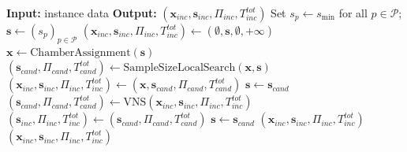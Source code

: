 \documentclass[11pt]{article}
\begin{document}
\begin{algorithm}[H]
\caption{Overall Solution Framework}
\label{alg:framework}
\label{alg:overall_framework}
\begin{algorithmic}[1]
\State \textbf{Input:} instance data
\State \textbf{Output:} \((\mathbf{x}_{inc},\mathbf{s}_{inc},\Pi_{inc},T^{tot}_{inc})\)
\State Set \(s_p\leftarrow s_{\min}\) for all \(p\in\mathcal{P}\); \(\mathbf{s}\leftarrow(s_p)_{p\in\mathcal{P}}\) \label{step:fw-init}
\State \((\mathbf{x}_{inc},\mathbf{s}_{inc},\Pi_{inc},T^{tot}_{inc})\leftarrow(\emptyset,\mathbf{s},\emptyset,+\infty)\)
    \State \(\mathbf{x}\leftarrow\text{ChamberAssignment}(\mathbf{s})\) \label{step:fw-assign}
    \State \((\mathbf{s}_{cand},\Pi_{cand},T^{tot}_{cand})\leftarrow\text{SampleSizeLocalSearch}(\mathbf{x},\mathbf{s})\) \label{step:fw-ls}
     \label{step:fw-lex}
        \State \((\mathbf{x}_{inc},\mathbf{s}_{inc},\Pi_{inc},T^{tot}_{inc})\leftarrow(\mathbf{x},\mathbf{s}_{cand},\Pi_{cand},T^{tot}_{cand})\)
        \State \(\mathbf{s}\leftarrow\mathbf{s}_{cand}\)
    \Else
        \State \((\mathbf{s}_{cand},\Pi_{cand},T^{tot}_{cand})\leftarrow\text{VNS}(\mathbf{x}_{inc},\mathbf{s}_{inc},\Pi_{inc},T^{tot}_{inc})\) \label{step:fw-vns}
            \State \((\mathbf{s}_{inc},\Pi_{inc},T^{tot}_{inc})\leftarrow(\mathbf{s}_{cand},\Pi_{cand},T^{tot}_{cand})\)
            \State \(\mathbf{s}\leftarrow\mathbf{s}_{cand}\)
        \Else
            \State \Return \((\mathbf{x}_{inc},\mathbf{s}_{inc},\Pi_{inc},T^{tot}_{inc})\) \label{step:fw-stop}
        \EndIf
    \EndIf
\EndFor
\State \Return \((\mathbf{x}_{inc},\mathbf{s}_{inc},\Pi_{inc},T^{tot}_{inc})\)
\end{algorithmic}
\end{algorithm}
\end{document}
